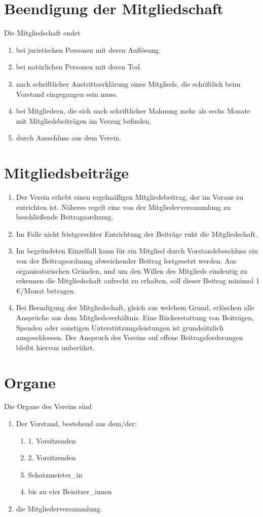 \documentclass[a4paper, 12pt]{scrartcl}
\begin{document}
\section{Beendigung der Mitgliedschaft}
Die Mitgliedschaft endet
\begin{enumerate}
	\item bei juristischen Personen mit deren Auflösung.
	\item bei natürlichen Personen mit deren Tod.
	\item nach schriftlicher Austrittserklärung eines Mitglieds, die schriftlich beim Vorstand eingegangen sein muss.
	\item bei Mitgliedern, die sich nach schriftlicher Mahnung mehr als sechs Monate mit Mitgliedsbeiträgen im Verzug befinden.
	\item durch Ausschluss aus dem Verein.
\end{enumerate}

\section{Mitgliedsbeiträge}
\label{mitgliedsbeitraege}
\begin{enumerate}
	\item Der Verein erhebt einen regelmäßigen Mitgliedsbeitrag, der im Voraus zu entrichten ist. Näheres regelt eine von der Mitgliederversammlung zu beschließende Beitragsordnung.
	\item Im Falle nicht fristgerechter Entrichtung der Beiträge ruht die Mitgliedschaft.
	\item \label{mitgliedsbeitraege-mindestbeitrag} Im begründeten Einzelfall kann für ein Mitglied durch Vorstandsbeschluss ein von der Beitragsordnung abweichender Beitrag festgesetzt werden. Aus organisatorischen Gründen, und um den Willen des Mitglieds eindeutig zu erkennen die Mitgliedschaft aufrecht zu erhalten, soll dieser Beitrag minimal 1 \euro/Monat betragen.
	\item Bei Beendigung der Mitgliedschaft, gleich aus welchem Grund, erlöschen alle Ansprüche aus dem Mitgliedsverhältnis. Eine Rückerstattung von Beiträgen, Spenden oder sonstigen Unterstützungsleistungen ist grundsätzlich ausgeschlossen. Der Anspruch des Vereins auf offene Beitragsforderungen bleibt hiervon unberührt.
\end{enumerate}

\section{Organe}
Die Organe des Vereins sind
\begin{enumerate}
	\item Der Vorstand, bestehend aus dem/der:
	\begin{enumerate}
		\item 1. Vorsitzenden
		\item 2. Vorsitzenden
		\item Schatzmeister\_in
		\item bis zu vier Beisitzer\_innen
	\end{enumerate}
	\item die Mitgliederversammlung.
\end{enumerate}
\end{document}
